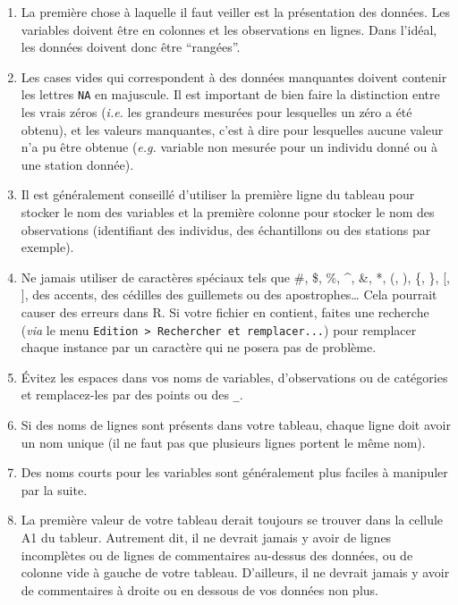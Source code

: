 \documentclass[
  a4paper,
]{article}
\providecommand{\tightlist}{%
  \setlength{\itemsep}{0pt}\setlength{\parskip}{0pt}}
\begin{document}
\begin{enumerate}
\def\labelenumi{\arabic{enumi}.}
\tightlist
\item
  La première chose à laquelle il faut veiller est la présentation des données. Les variables doivent être en colonnes et les observations en lignes. Dans l'idéal, les données doivent donc être ``rangées''.
\item
  Les cases vides qui correspondent à des données manquantes doivent contenir les lettres \texttt{NA} en majuscule. Il est important de bien faire la distinction entre les vrais zéros (\emph{i.e.} les grandeurs mesurées pour lesquelles un zéro a été obtenu), et les valeurs manquantes, c'est à dire pour lesquelles aucune valeur n'a pu être obtenue (\emph{e.g.} variable non mesurée pour un individu donné ou à une station donnée).
\item
  Il est généralement conseillé d'utiliser la première ligne du tableau pour stocker le nom des variables et la première colonne pour stocker le nom des observations (identifiant des individus, des échantillons ou des stations par exemple).
\item
  Ne jamais utiliser de caractères spéciaux tels que \#, \$, \%, \^{}, \&, *, (, ), \{, \}, {[}, {]}, des accents, des cédilles des guillemets ou des apostrophes\ldots{} Cela pourrait causer des erreurs dans R. Si votre fichier en contient, faites une recherche (\emph{via} le menu \texttt{Edition\ \textgreater{}\ Rechercher\ et\ remplacer...}) pour remplacer chaque instance par un caractère qui ne posera pas de problème.
\item
  Évitez les espaces dans vos noms de variables, d'observations ou de catégories et remplacez-les par des points ou des \texttt{\_}.
\item
  Si des noms de lignes sont présents dans votre tableau, chaque ligne doit avoir un nom unique (il ne faut pas que plusieurs lignes portent le même nom).
\item
  Des noms courts pour les variables sont généralement plus faciles à manipuler par la suite.
\item
  La première valeur de votre tableau derait toujours se trouver dans la cellule A1 du tableur. Autrement dit, il ne devrait jamais y avoir de lignes incomplètes ou de lignes de commentaires au-dessus des données, ou de colonne vide à gauche de votre tableau. D'ailleurs, il ne devrait jamais y avoir de commentaires à droite ou en dessous de vos données non plus.
\end{enumerate}
\end{document}
